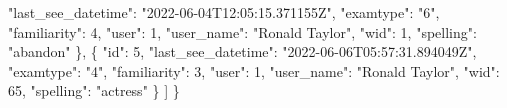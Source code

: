 \documentclass[
]{article}
\newenvironment{Shaded}{}{}
\newcommand{\DataTypeTok}[1]{\textcolor[rgb]{0.56,0.13,0.00}{#1}}
\newcommand{\DecValTok}[1]{\textcolor[rgb]{0.25,0.63,0.44}{#1}}
\newcommand{\FunctionTok}[1]{\textcolor[rgb]{0.02,0.16,0.49}{#1}}
\newcommand{\OtherTok}[1]{\textcolor[rgb]{0.00,0.44,0.13}{#1}}
\newcommand{\StringTok}[1]{\textcolor[rgb]{0.25,0.44,0.63}{#1}}
\begin{document}
\begin{Shaded}
\begin{Highlighting}[]
      \DataTypeTok{"last\_see\_datetime"}\FunctionTok{:} \StringTok{"2022{-}06{-}04T12:05:15.371155Z"}\FunctionTok{,}
      \DataTypeTok{"examtype"}\FunctionTok{:} \StringTok{"6"}\FunctionTok{,}
      \DataTypeTok{"familiarity"}\FunctionTok{:} \DecValTok{4}\FunctionTok{,}
      \DataTypeTok{"user"}\FunctionTok{:} \DecValTok{1}\FunctionTok{,}
      \DataTypeTok{"user\_name"}\FunctionTok{:} \StringTok{"Ronald Taylor"}\FunctionTok{,}
      \DataTypeTok{"wid"}\FunctionTok{:} \DecValTok{1}\FunctionTok{,}
      \DataTypeTok{"spelling"}\FunctionTok{:} \StringTok{"abandon"}
    \FunctionTok{\}}\OtherTok{,}
    \FunctionTok{\{}
      \DataTypeTok{"id"}\FunctionTok{:} \DecValTok{5}\FunctionTok{,}
      \DataTypeTok{"last\_see\_datetime"}\FunctionTok{:} \StringTok{"2022{-}06{-}06T05:57:31.894049Z"}\FunctionTok{,}
      \DataTypeTok{"examtype"}\FunctionTok{:} \StringTok{"4"}\FunctionTok{,}
      \DataTypeTok{"familiarity"}\FunctionTok{:} \DecValTok{3}\FunctionTok{,}
      \DataTypeTok{"user"}\FunctionTok{:} \DecValTok{1}\FunctionTok{,}
      \DataTypeTok{"user\_name"}\FunctionTok{:} \StringTok{"Ronald Taylor"}\FunctionTok{,}
      \DataTypeTok{"wid"}\FunctionTok{:} \DecValTok{65}\FunctionTok{,}
      \DataTypeTok{"spelling"}\FunctionTok{:} \StringTok{"actress"}
    \FunctionTok{\}}
  \OtherTok{]}
\FunctionTok{\}}
\end{Highlighting}
\end{Shaded}
\end{document}
